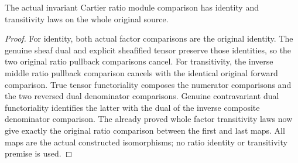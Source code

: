 \begin{lemma}
\label{lem:cartier-ratio-whole-invariant-transitivity}
\leanok
The actual invariant Cartier ratio module comparison has identity and
transitivity laws on the whole original source.
\end{lemma}
\begin{proof}
For identity, both actual factor comparisons are the original identity.
The genuine sheaf dual and explicit sheafified tensor preserve those
identities, so the two original ratio pullback comparisons cancel.
For transitivity, the inverse middle ratio pullback comparison cancels
with the identical original forward comparison. True tensor
functoriality composes the numerator comparisons and the two reversed
dual denominator comparisons. Genuine contravariant dual functoriality
identifies the latter with the dual of the inverse composite denominator
comparison. The already proved whole factor transitivity laws now give
exactly the original ratio comparison between the first and last maps.
All maps are the actual constructed isomorphisms; no ratio
identity or transitivity premise is used.
\end{proof}
